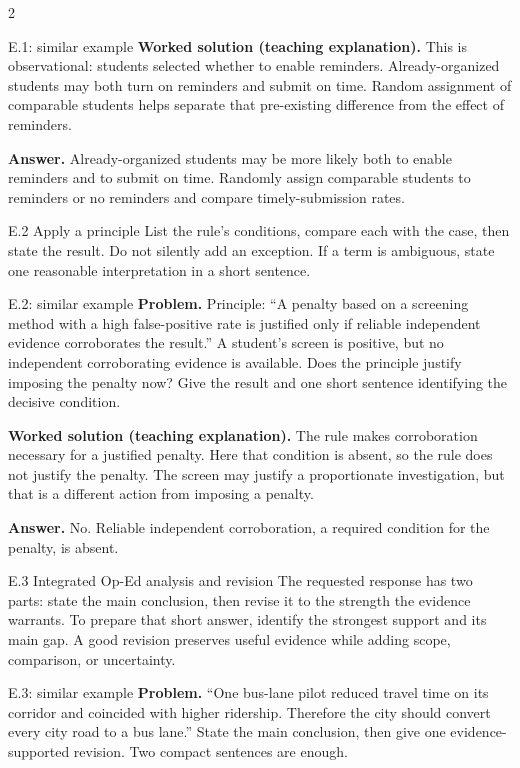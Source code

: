\documentclass[10pt]{extarticle}
\begin{document}
\begin{multicols}{2}
\begin{workedbox}{E.1: similar example}
\textbf{Worked solution (teaching explanation).} This is observational: students selected whether to enable reminders. Already-organized students may both turn on reminders and submit on time. Random assignment of comparable students helps separate that pre-existing difference from the effect of reminders.

\textbf{Answer.} Already-organized students may be more likely both to enable reminders and to submit on time. Randomly assign comparable students to reminders or no reminders and compare timely-submission rates.
\end{workedbox}

\begin{methodbox}{E.2 Apply a principle}
List the rule's conditions, compare each with the case, then state the result.
Do not silently add an exception. If a term is ambiguous, state one reasonable
interpretation in a short sentence.
\end{methodbox}
\begin{workedbox}{E.2: similar example}
\textbf{Problem.} Principle: ``A penalty based on a screening method with a high false-positive rate is justified only if reliable independent evidence corroborates the result.'' A student's screen is positive, but no independent corroborating evidence is available. Does the principle justify imposing the penalty now? Give the result and one short sentence identifying the decisive condition.

\textbf{Worked solution (teaching explanation).} The rule makes corroboration necessary for a justified penalty. Here that condition is absent, so the rule does not justify the penalty. The screen may justify a proportionate investigation, but that is a different action from imposing a penalty.

\textbf{Answer.} No. Reliable independent corroboration, a required condition for the penalty, is absent.
\end{workedbox}

\columnbreak
\begin{methodbox}{E.3 Integrated Op-Ed analysis and revision}
The requested response has two parts: state the main conclusion, then revise it
to the strength the evidence warrants. To prepare that short answer, identify
the strongest support and its main gap. A good
revision preserves useful evidence while adding scope, comparison, or uncertainty.
\end{methodbox}
\begin{workedbox}{E.3: similar example}
\textbf{Problem.} ``One bus-lane pilot reduced travel time on its corridor and coincided with higher ridership. Therefore the city should convert every city road to a bus lane.'' State the main conclusion, then give one evidence-supported revision. Two compact sentences are enough.


\end{workedbox}
\end{multicols}
\end{document}
